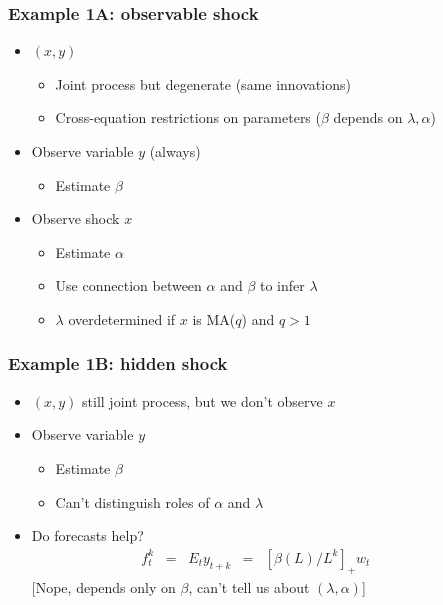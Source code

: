 \documentclass{beamer}
\begin{document}
\begin{frame}
\frametitle{Example 1A: observable shock}
\begin{itemize}  \itemsep=\bigskipamount
\item $(x,y)$ \\
\begin{itemize}
\item Joint process but degenerate (same innovations)
\item Cross-equation restrictions on parameters ($\beta$ depends on $\lambda,\alpha$)
\end{itemize}
\item Observe variable $y$ (always) \\
\begin{itemize}
\item Estimate $\beta$
\end{itemize}
\item Observe shock $x$ \\
\begin{itemize}
\item Estimate $\alpha$
\item Use connection between $\alpha$ and $\beta$ to infer $\lambda$
\item $\lambda$ overdetermined if $x$ is MA($q$) and $q>1$
\end{itemize}
\end{itemize}
\end{frame}

\begin{frame}
\frametitle{Example 1B: hidden shock}
\begin{itemize}  \itemsep=\bigskipamount
\item $(x,y)$ still joint process, but we don't observe $x$
\item Observe variable $y$ \\
\begin{itemize}
\item Estimate $\beta$
\item Can't distinguish roles of $\alpha$ and $\lambda$
\end{itemize}
\item Do forecasts help?
\begin{eqnarray*}
    f^k_t \;\;=\;\; E_t y_{t+k} &=& \left[ \beta(L)/L^k\right]_+ w_t  \phantom{xxxx}
\end{eqnarray*}
\hspace{0.4in}[Nope, depends only on $\beta$, can't tell us about $(\lambda,\alpha)$]
\end{itemize}
\end{frame}
\end{document}
